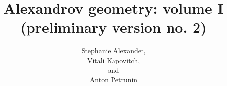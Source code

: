 \frontmatter
\title{Alexandrov geometry: volume I\\
{\large (preliminary version no. 2)}}
\date{}
\author{Stephanie Alexander,\\ Vitali Kapovitch,\\ and\\ Anton Petrunin}
\maketitle
